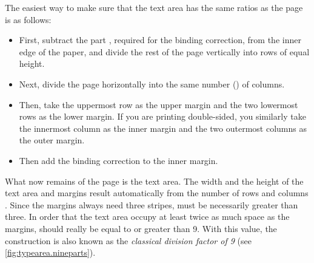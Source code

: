 \begin{Explain}
  The easiest way to make sure that the text area has the same ratios
  as the page is as follows:
  \begin{itemize}
  \item First, subtract the part , required for the binding
    correction, from the inner edge of the paper,
    and divide the rest of the page vertically into  rows of equal
    height.
  \item Next, divide the page horizontally into the same number () of
    columns.
  \item Then, take the uppermost row as the upper margin and the two lowermost
    rows as the lower margin. If you are printing double-sided, you similarly
    take the innermost column as the inner margin and the two outermost
    columns as the outer margin.
  \item Then add the binding correction  to the inner margin.
  \end{itemize}
  What now remains of the page is the text area. The width
  and the height of the text area and margins result automatically from the
  number of rows and columns . Since the margins always need three
  stripes,  must be necessarily greater than three. In order that the
  text area occupy at least twice as much space as the margins, 
  should really be equal to or greater than 9. With this value, the
  construction is also known as the \emph{classical division factor of 9} (see
  \autoref{fig:typearea.nineparts}).


\end{Explain}
